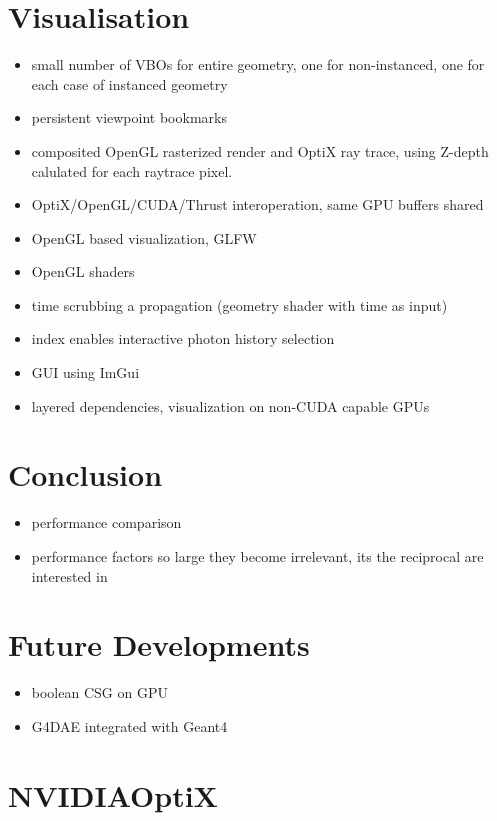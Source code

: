 \documentclass[a4paper]{jpconf}
\begin{document}
\section{Visualisation}

\begin{itemize}
\item small number of VBOs for entire geometry, one for non-instanced, one for each case of instanced geometry
\item persistent viewpoint bookmarks 
\item composited OpenGL rasterized render and OptiX ray trace, using Z-depth calulated for each raytrace pixel.
\item OptiX/OpenGL/CUDA/Thrust interoperation, same GPU buffers shared
\item OpenGL based visualization, GLFW
\item OpenGL shaders
\item time scrubbing a propagation (geometry shader with time as input)
\item index enables interactive photon history selection
\item GUI using ImGui\cite{ImGui}
\item layered dependencies, visualization on non-CUDA capable GPUs
\end{itemize}


\section{Conclusion}

\begin{itemize}
\item performance comparison
\item performance factors so large they become irrelevant, its the reciprocal are interested in 
\end{itemize}


\section{Future Developments}

\begin{itemize}
\item boolean CSG on GPU
\item G4DAE integrated with Geant4
\end{itemize}



\section{NVIDIA\textregistered OptiX\texttrademark}
\end{document}
